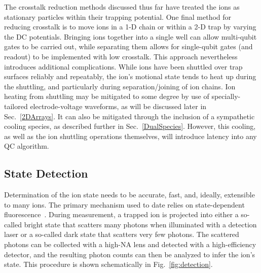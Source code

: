 \documentclass[%
reprint,
 amsmath,amssymb,
]{revtex4-1}
\newcommand{\one}{|1 \rangle}
\begin{document}
The crosstalk reduction methods discussed thus far have treated the ions as stationary particles within their trapping potential. One final method for reducing crosstalk is to move ions in a 1-D chain \cite{NIST:ion_transport:2002,WarringIndividualAddress2013} or within a 2-D trap \cite{KielpinskiQCArchitecture2002} by varying the DC potentials. Bringing ions together into a single well can allow multi-qubit gates to be carried out, while separating them allows for single-qubit gates (and readout) to be implemented with low crosstalk. This approach nevertheless introduces additional complications. While ions have been shuttled over trap surfaces reliably and repeatably, the ion's motional state tends to heat up during the shuttling, and particularly during separation/joining of ion chains. Ion heating from shuttling may be mitigated to some degree by use of specially-tailored electrode-voltage waveforms, as will be discussed later in Sec.~\ref{2DArrays}.  It can also be mitigated through the inclusion of a sympathetic cooling species, as described further in Sec.~\ref{DualSpecies}. However, this cooling, as well as the ion shuttling operations themselves, will introduce latency into any QC algorithm.

\subsection{State Detection}
\label{Detection}
Determination of the ion state needs to be accurate, fast, and, ideally, extensible to many ions. The primary mechanism used to date relies on state-dependent fluorescence~\cite{PhysRevLett.56.2797,PhysRevLett.57.1699,PhysRevLett.57.1696}. During measurement, a trapped ion is projected into either a so-called bright state that scatters many photons when illuminated with a detection laser or a so-called dark state that scatters very few photons. The scattered photons can be collected with a high-NA lens and detected with a high-efficiency detector, and the resulting photon counts can then be analyzed to infer the ion's state. This procedure is shown schematically in Fig.~\ref{fig:detection}.

\end{document}
